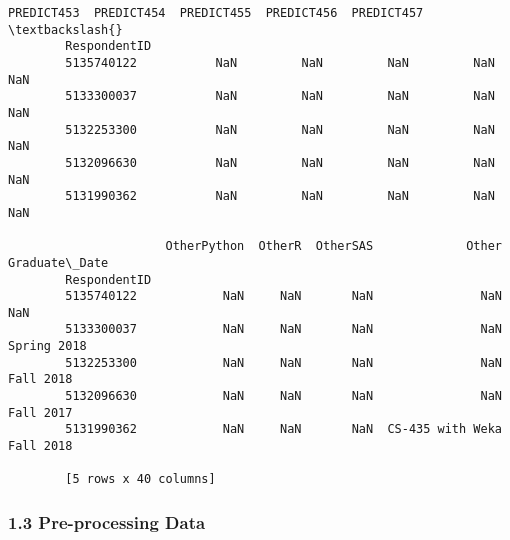 \documentclass[11pt]{article}
\begin{document}
\begin{Verbatim}[commandchars=\\\{\}]
                      PREDICT453  PREDICT454  PREDICT455  PREDICT456  PREDICT457  \textbackslash{}
        RespondentID                                                               
        5135740122           NaN         NaN         NaN         NaN         NaN   
        5133300037           NaN         NaN         NaN         NaN         NaN   
        5132253300           NaN         NaN         NaN         NaN         NaN   
        5132096630           NaN         NaN         NaN         NaN         NaN   
        5131990362           NaN         NaN         NaN         NaN         NaN   
        
                      OtherPython  OtherR  OtherSAS             Other  Graduate\_Date  
        RespondentID                                                                  
        5135740122            NaN     NaN       NaN               NaN            NaN  
        5133300037            NaN     NaN       NaN               NaN    Spring 2018  
        5132253300            NaN     NaN       NaN               NaN      Fall 2018  
        5132096630            NaN     NaN       NaN               NaN      Fall 2017  
        5131990362            NaN     NaN       NaN  CS-435 with Weka      Fall 2018  
        
        [5 rows x 40 columns]
\end{Verbatim}
            
    \hypertarget{pre-processing-data}{%
\subsubsection{1.3 \textbar{} Pre-processing
Data}\label{pre-processing-data}}
\end{document}
